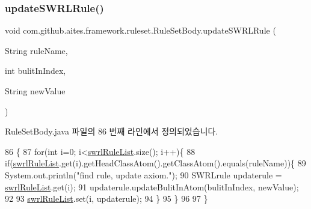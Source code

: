 \mbox{\label{classcom_1_1github_1_1aites_1_1framework_1_1ruleset_1_1_rule_set_body_a64c55afee8f8bd5cfef407bbc11bd405}} 
\subsubsection{\texorpdfstring{update\+S\+W\+R\+L\+Rule()}{updateSWRLRule()}}
{\footnotesize\ttfamily void com.\+github.\+aites.\+framework.\+ruleset.\+Rule\+Set\+Body.\+update\+S\+W\+R\+L\+Rule (\begin{DoxyParamCaption}\item[{String}]{rule\+Name,  }\item[{int}]{bulit\+In\+Index,  }\item[{String}]{new\+Value }\end{DoxyParamCaption})}



Rule\+Set\+Body.\+java 파일의 86 번째 라인에서 정의되었습니다.


\begin{DoxyCode}
86                                                                                   \{
87         \textcolor{keywordflow}{for}(\textcolor{keywordtype}{int} i=0; i<\mbox{\hyperlink{classcom_1_1github_1_1aites_1_1framework_1_1ruleset_1_1_rule_set_body_aa0c93dd6d2a58be027c0d55f742d0b64}{swrlRuleList}}.size(); i++)\{
88             \textcolor{keywordflow}{if}(\mbox{\hyperlink{classcom_1_1github_1_1aites_1_1framework_1_1ruleset_1_1_rule_set_body_aa0c93dd6d2a58be027c0d55f742d0b64}{swrlRuleList}}.get(i).getHeadClassAtom().getClassAtom().equals(ruleName))\{
89                 System.out.println(\textcolor{stringliteral}{"find rule, update axiom."});
90                 SWRLrule updaterule = \mbox{\hyperlink{classcom_1_1github_1_1aites_1_1framework_1_1ruleset_1_1_rule_set_body_aa0c93dd6d2a58be027c0d55f742d0b64}{swrlRuleList}}.get(i);
91                 updaterule.updateBulitInAtom(bulitInIndex, newValue);
92                 
93                 \mbox{\hyperlink{classcom_1_1github_1_1aites_1_1framework_1_1ruleset_1_1_rule_set_body_aa0c93dd6d2a58be027c0d55f742d0b64}{swrlRuleList}}.set(i, updaterule);
94             \}
95         \}       
96         
97     \}
\end{DoxyCode}


